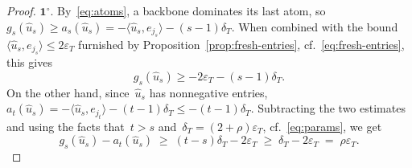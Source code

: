 \documentclass[11pt]{article}
\numberwithin{equation}{section}
\let\le\leqslant
\let\ge\geqslant
\theoremstyle{remark}
\newcommand{\proofstep}[1]{$\textbf{#1}^{\circ}$}
\newcommand{\veps}{\varepsilon}
\newcommand{\1}{\mathbf{1}}
\begin{document}
\begin{proof}
\proofstep{1}. %
By~\eqref{eq:atoms}, a backbone dominates its last atom, so
$
g_s(\hat u_s) \ge a_s(\hat u_s) = -\langle \hat u_{s}, e_{j_s} \rangle - (s-1)\delta_T.
$
When combined with the bound~$\langle \hat u_{s}, e_{j_s} \rangle \le 2\veps_T$ furnished by Proposition~\ref{prop:fresh-entries}, cf.~\eqref{eq:fresh-entries}, this gives
\[
g_s(\hat u_s)\ge-2\veps_T-(s-1)\delta_T.
\] 
On the other hand, since~$\hat u_{s}$ has nonnegative entries,~$a_t(\hat u_s)=-\langle \hat u_{s}, e_{j_t}\rangle - (t-1)\delta_T \le-(t-1)\delta_T$. 
Subtracting the two estimates and using the facts that~$t > s$ and~$\delta_T=(2+\rho)\veps_T$, cf.~\eqref{eq:params}, we get
\begin{equation*}
        g_s(\hat u_s)-a_t(\hat u_s)
        \;\ge\;
        (t-s)\delta_T-2\veps_T
        \;\ge\;
        \delta_T-2\veps_T
        \;=\; \rho\veps_T.
\end{equation*}


\end{proof}
\end{document}
